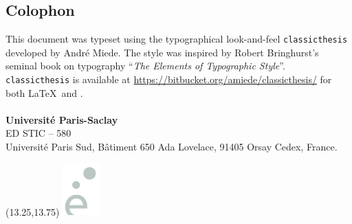 \begin{addmargin}[-.5cm]{-2.5cm}
\vspace*{-2mm}
\normalcolor
\section*{Colophon}
\vspace*{-2mm}
\noindent This document was typeset using the typographical look-and-feel \texttt{cla\-ssic\-the\-sis} developed by Andr\'e Miede. The style was inspired by Robert Bringhurst's seminal book on typography ``\emph{The Elements of Typographic Style}''. \texttt{cla\-ssic\-the\-sis} is available at \url{https://bitbucket.org/amiede/classicthesis/} for both \LaTeX\ and \mLyX.
\paragraph{}
\vspace*{-2mm}
\noindent \color{PSaclay}\textbf{Universit\'e Paris-Saclay} \\
ED STIC -- 580 \\
Universit\'e Paris Sud, B\^atiment 650 Ada Lovelace, 91405 Orsay Cedex, France.

\begin{textblock}{13}(13.25,13.75)
\includegraphics[height=2cm]{../gfx/logoEgrey.png}
\end{textblock}

\end{addmargin}

